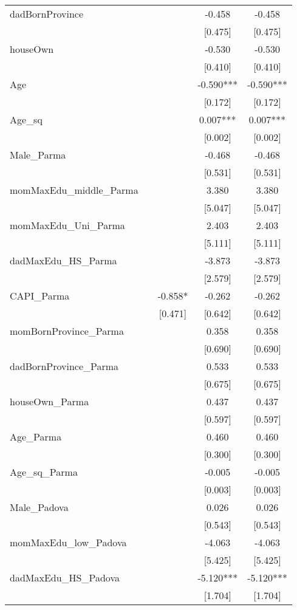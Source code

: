 \documentclass[]{article}
\begin{document}
\begin{tabular}{lcccc}
dadBornProvince &  &  & -0.458 & -0.458 \\
 &  &  & [0.475] & [0.475] \\
houseOwn &  &  & -0.530 & -0.530 \\
 &  &  & [0.410] & [0.410] \\
Age &  &  & -0.590*** & -0.590*** \\
 &  &  & [0.172] & [0.172] \\
Age\_sq &  &  & 0.007*** & 0.007*** \\
 &  &  & [0.002] & [0.002] \\
Male\_Parma &  &  & -0.468 & -0.468 \\
 &  &  & [0.531] & [0.531] \\
momMaxEdu\_middle\_Parma &  &  & 3.380 & 3.380 \\
 &  &  & [5.047] & [5.047] \\
momMaxEdu\_Uni\_Parma &  &  & 2.403 & 2.403 \\
 &  &  & [5.111] & [5.111] \\
dadMaxEdu\_HS\_Parma &  &  & -3.873 & -3.873 \\
 &  &  & [2.579] & [2.579] \\
CAPI\_Parma &  & -0.858* & -0.262 & -0.262 \\
 &  & [0.471] & [0.642] & [0.642] \\
momBornProvince\_Parma &  &  & 0.358 & 0.358 \\
 &  &  & [0.690] & [0.690] \\
dadBornProvince\_Parma &  &  & 0.533 & 0.533 \\
 &  &  & [0.675] & [0.675] \\
houseOwn\_Parma &  &  & 0.437 & 0.437 \\
 &  &  & [0.597] & [0.597] \\
Age\_Parma &  &  & 0.460 & 0.460 \\
 &  &  & [0.300] & [0.300] \\
Age\_sq\_Parma &  &  & -0.005 & -0.005 \\
 &  &  & [0.003] & [0.003] \\
Male\_Padova &  &  & 0.026 & 0.026 \\
 &  &  & [0.543] & [0.543] \\
momMaxEdu\_low\_Padova &  &  & -4.063 & -4.063 \\
 &  &  & [5.425] & [5.425] \\
dadMaxEdu\_HS\_Padova &  &  & -5.120*** & -5.120*** \\
 &  &  & [1.704] & [1.704] \\

\end{tabular}
\end{document}
